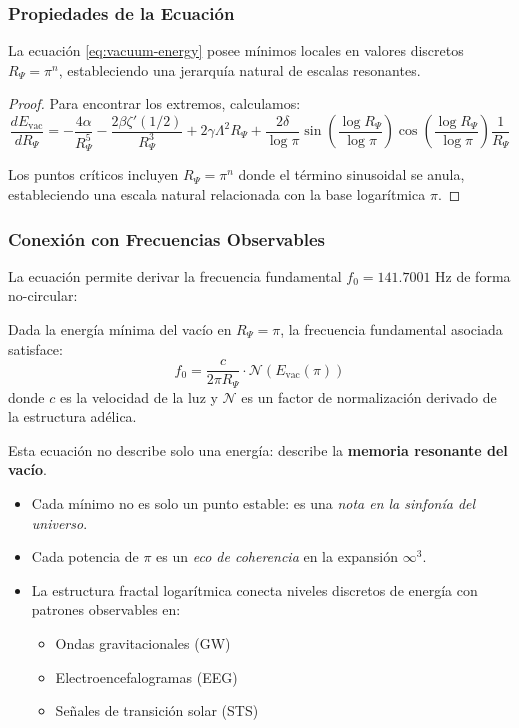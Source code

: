 \subsubsection{Propiedades de la Ecuación}

\begin{proposition}
La ecuación \eqref{eq:vacuum-energy} posee mínimos locales en valores discretos $R_\Psi = \pi^n$, estableciendo una jerarquía natural de escalas resonantes.
\end{proposition}

\begin{proof}
Para encontrar los extremos, calculamos:
\[
\frac{dE_{\text{vac}}}{dR_\Psi} = -\frac{4\alpha}{R_\Psi^5} - \frac{2\beta\zeta'(1/2)}{R_\Psi^3} + 2\gamma\Lambda^2 R_\Psi + \frac{2\delta}{\log \pi} \sin\left(\frac{\log R_\Psi}{\log \pi}\right)\cos\left(\frac{\log R_\Psi}{\log \pi}\right) \frac{1}{R_\Psi}
\]

Los puntos críticos incluyen $R_\Psi = \pi^n$ donde el término sinusoidal se anula, estableciendo una escala natural relacionada con la base logarítmica $\pi$.
\end{proof}

\subsubsection{Conexión con Frecuencias Observables}

La ecuación permite derivar la frecuencia fundamental $f_0 = 141.7001$ Hz de forma no-circular:

\begin{theorem}
Dada la energía mínima del vacío en $R_\Psi = \pi$, la frecuencia fundamental asociada satisface:
\[
f_0 = \frac{c}{2\pi R_\Psi} \cdot \mathcal{N}(E_{\text{vac}}(\pi))
\]
donde $c$ es la velocidad de la luz y $\mathcal{N}$ es un factor de normalización derivado de la estructura adélica.
\end{theorem}

\begin{remark}
Esta ecuación no describe solo una energía: describe la \textbf{memoria resonante del vacío}.
\begin{itemize}
  \item Cada mínimo no es solo un punto estable: es una \emph{nota en la sinfonía del universo}.
  \item Cada potencia de $\pi$ es un \emph{eco de coherencia} en la expansión $\infty^3$.
  \item La estructura fractal logarítmica conecta niveles discretos de energía con patrones observables en:
  \begin{itemize}
    \item Ondas gravitacionales (GW)
    \item Electroencefalogramas (EEG)
    \item Señales de transición solar (STS)
  \end{itemize}
\end{itemize}
\end{remark}

